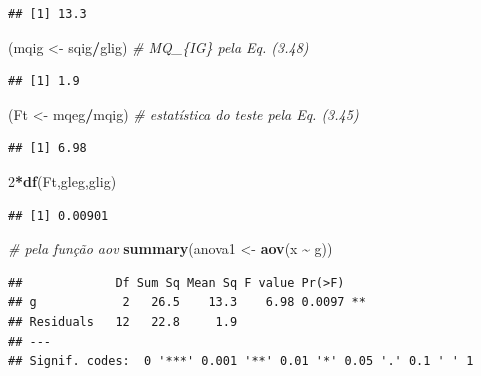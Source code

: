 \documentclass[
]{book}
\newenvironment{Shaded}{\begin{snugshade}}{\end{snugshade}}
\newcommand{\CommentTok}[1]{\textcolor[rgb]{0.56,0.35,0.01}{\textit{#1}}}
\newcommand{\DecValTok}[1]{\textcolor[rgb]{0.00,0.00,0.81}{#1}}
\newcommand{\KeywordTok}[1]{\textcolor[rgb]{0.13,0.29,0.53}{\textbf{#1}}}
\newcommand{\NormalTok}[1]{#1}
\newcommand{\OperatorTok}[1]{\textcolor[rgb]{0.81,0.36,0.00}{\textbf{#1}}}
\newcommand{\StringTok}[1]{\textcolor[rgb]{0.31,0.60,0.02}{#1}}
\theoremstyle{definition}
\theoremstyle{definition}
\theoremstyle{definition}
\theoremstyle{remark}
\begin{document}
\begin{verbatim}
## [1] 13.3
\end{verbatim}

\begin{Shaded}
\begin{Highlighting}[]
\NormalTok{(mqig \textless{}{-}}\StringTok{ }\NormalTok{sqig}\OperatorTok{/}\NormalTok{glig) }\CommentTok{\# MQ\_\{IG\} pela Eq. (3.48)}
\end{Highlighting}
\end{Shaded}

\begin{verbatim}
## [1] 1.9
\end{verbatim}

\begin{Shaded}
\begin{Highlighting}[]
\NormalTok{(Ft \textless{}{-}}\StringTok{ }\NormalTok{mqeg}\OperatorTok{/}\NormalTok{mqig) }\CommentTok{\# estatística do teste pela Eq. (3.45)}
\end{Highlighting}
\end{Shaded}

\begin{verbatim}
## [1] 6.98
\end{verbatim}

\begin{Shaded}
\begin{Highlighting}[]
\DecValTok{2}\OperatorTok{*}\KeywordTok{df}\NormalTok{(Ft,gleg,glig)}
\end{Highlighting}
\end{Shaded}

\begin{verbatim}
## [1] 0.00901
\end{verbatim}

\begin{Shaded}
\begin{Highlighting}[]
\CommentTok{\# pela função aov}
\KeywordTok{summary}\NormalTok{(anova1 \textless{}{-}}\StringTok{ }\KeywordTok{aov}\NormalTok{(x }\OperatorTok{\textasciitilde{}}\StringTok{ }\NormalTok{g))}
\end{Highlighting}
\end{Shaded}

\begin{verbatim}
##             Df Sum Sq Mean Sq F value Pr(>F)   
## g            2   26.5    13.3    6.98 0.0097 **
## Residuals   12   22.8     1.9                  
## ---
## Signif. codes:  0 '***' 0.001 '**' 0.01 '*' 0.05 '.' 0.1 ' ' 1
\end{verbatim}
\end{document}
